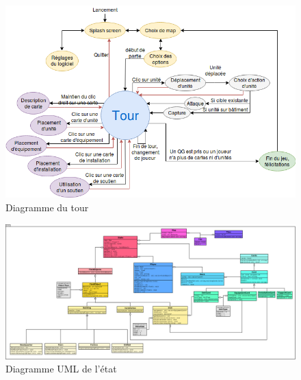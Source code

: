 \begin{figure}[h]
    \centering
    \includegraphics[scale =0.65]{images/etatsDeJeu.png}
    \caption{Diagramme du tour}
    \label{fig:Advance Wars}
\end{figure}


\begin{figure}[h]
    \centering
    \includegraphics[scale =0.17]{images/UMLstate.png}
    \caption{Diagramme UML de l'état}
    \label{fig:Advance Wars}
\end{figure}

